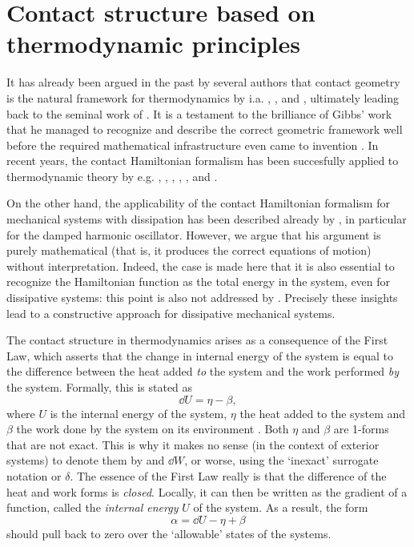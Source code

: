 \section{Contact structure based on thermodynamic principles}
\label{sec:thermodynamics}
It has already been argued in the past by several authors that contact geometry is the natural framework for thermodynamics by i.a. \citet{Arnold1991,Arnold1989a,Arnold1989,Arnold1989b}, \citet{Bamberg1988}, \citet{Burke1985} and \citet{Hermann1973}, ultimately leading back to the seminal work of \citet{Gibbs1873}. It is a testament to the brilliance of Gibbs' work that he managed to recognize and describe the correct geometric framework well before the required mathematical infrastructure even came to invention \cite{Wightman1979}. 
In recent years, the contact Hamiltonian formalism has been succesfully applied to thermodynamic theory by e.g. \citet{Mrugala1991,Mrugala2000,Mrugala1984,Mrugala1985,Mrugala1993,Mrugala1996}, \citet{Balian2001}, \citet{VanderSchaft2021a,VanderSchaft2018}, \citet{Maschke2018}, \citet{Bravetti2015}, and \citet{Simoes2020}. 

On the other hand, the applicability of the contact Hamiltonian formalism for mechanical systems with dissipation has been described already by \citet{Bravetti2017}, in particular for the damped harmonic oscillator. However, we argue that his argument is purely mathematical (that is, it produces the correct equations of motion) without interpretation. Indeed, the case is made here that it is also essential to recognize the Hamiltonian function as the total energy in the system, even for dissipative systems: this point is also not addressed by \citeauthor{Bravetti2017}. Precisely these insights lead to a constructive approach for dissipative mechanical systems.

The contact structure in thermodynamics arises as a consequence of the First Law, which asserts that the change in internal energy of the system is equal to the difference between the heat added \emph{to} the system and the work performed \emph{by} the system. Formally, this is stated as
\begin{equation}
    \dd{U} = \eta - \beta,
    \label{eq:thermo_first_law}
\end{equation}
where $U$ is the internal energy of the system, $\eta$ the heat added to the system and $\beta$ the work done by the system on its environment \cite{Bamberg1988,Frankel2012}. Both $\eta$ and $\beta$ are 1-forms that are not exact. This is why it makes no sense (in the context of exterior systems) to denote them by and $\dd{W}$, or worse, using the `inexact' surrogate notation \dj\xspace or $\delta$. The essence of the First Law really is that the difference of the heat and work forms is \emph{closed}. Locally, it can then be written as the gradient of a function, called the \emph{internal energy} $U$ of the system. As a result, the form 
$$ \alpha = \dd{U} - \eta + \beta $$
should pull back to zero over the `allowable' states of the systems.


